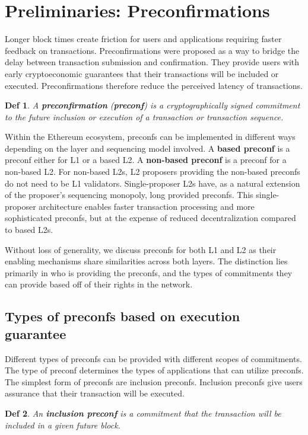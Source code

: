 \documentclass[a4paper]{article}
\theoremstyle{boldstyle}
\newtheorem*{definitionx}{Def}
\newenvironment{definition}
  {\begin{defopenboxq}\begin{definitionx}}
  {\end{definitionx}\end{defopenboxq}}
\newcommand{\todoqb}[1]{\todo[color=red!40]{\textbf{Quentin:} #1}}
\begin{document}
\section{Preliminaries: Preconfirmations}
    Longer block times create friction for users and applications requiring faster feedback on transactions. Preconfirmations were proposed as a way to bridge the delay between transaction submission and confirmation\todoqb{reference}. They provide users with early cryptoeconomic guarantees that their transactions will be included or executed. Preconfirmations therefore reduce the perceived latency of transactions. 
        \begin{definition}
        A \textbf{preconfirmation} (\textbf{preconf}) is a cryptographically signed commitment to the future inclusion or execution of a transaction or transaction sequence.
        \end{definition}
    Within the Ethereum ecosystem, preconfs can be implemented in different ways depending on the layer and sequencing model involved. A \textbf{based preconf} is a preconf either for L1 or a based L2. A \textbf{non-based preconf} is a preconf for a non-based L2. For non-based L2s, L2 proposers providing the non-based preconfs do not need to be L1 validators. Single-proposer L2s have, as a natural extension of the proposer's sequencing monopoly, long provided preconfs. This single-proposer architecture enables faster transaction processing and more sophisticated preconfs, but at the expense of reduced decentralization compared to based L2s.

    Without loss of generality, we discuss preconfs for both L1 and L2 as their enabling mechanisms share similarities across both layers. The distinction lies primarily in who is providing the preconfs, and the types of commitments they can provide based off of their rights in the network. 
    
    \subsection{Types of preconfs based on execution guarantee}
        Different types of preconfs can be provided with different scopes of commitments. The type of preconf determines the types of applications that can utilize preconfs. The simplest form of preconfs are inclusion preconfs. Inclusion preconfs give users assurance that their transaction will be executed. 
        \begin{definition}
        An \textbf{inclusion preconf} is a commitment that the transaction will be included in a given future block.
        \end{definition}
\end{document}
